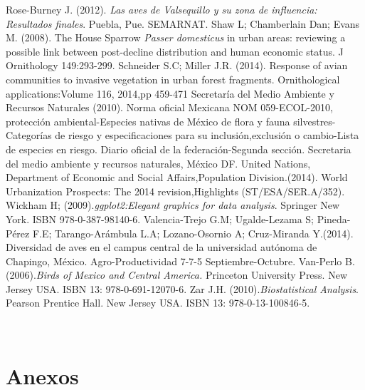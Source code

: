 \documentclass[letterpaper,12pt]{article}
\begin{document}
\begin{thebibliography}{37}
Rose-Burney J. (2012). \textit{Las aves de Valsequillo y su zona de influencia: Resultados finales}. Puebla, Pue. SEMARNAT. 
\bibitem{} Shaw L; Chamberlain Dan; Evans M. (2008). The House Sparrow \textit{Passer domesticus} in urban areas: reviewing a possible link between post-decline distribution and human economic status. J Ornithology 149:293-299. 	
Schneider S.C; Miller J.R. (2014). Response of avian communities to invasive vegetation in urban forest fragments. Ornithological applications:Volume 116, 2014,pp 459-471
Secretaría del Medio Ambiente y Recursos Naturales (2010). Norma oficial Mexicana NOM 059-ECOL-2010, protección ambiental-Especies nativas de México de flora y fauna silvestres-Categorías de riesgo y especificaciones para su inclusión,exclusión o cambio-Lista de especies en riesgo. Diario oficial de la federación-Segunda sección. Secretaria del medio ambiente y recursos naturales, México DF. 
United Nations, Department of Economic and Social Affairs,Population Division.(2014). World Urbanization Prospects: The 2014 revision,Highlights (ST/ESA/SER.A/352).
Wickham H; (2009).\textit{ggplot2:Elegant graphics for data analysis}. Springer New York. ISBN 978-0-387-98140-6.
Valencia-Trejo G.M; Ugalde-Lezama S; Pineda-Pérez F.E; Tarango-Arámbula L.A; Lozano-Osornio A; Cruz-Miranda Y.(2014). Diversidad de aves en el campus central de la universidad autónoma de Chapingo, México. Agro-Productividad 7-7-5 Septiembre-Octubre.
Van-Perlo B. (2006).\textit{Birds of Mexico and Central America.} Princeton University Press. New Jersey USA. ISBN 13: 978-0-691-12070-6.
Zar J.H. (2010).\textit{Biostatistical Analysis}. Pearson Prentice Hall. New Jersey USA. ISBN 13: 978-0-13-100846-5.
\end{thebibliography} \\[1cm]
\newpage
\section{Anexos}
\end{document}
